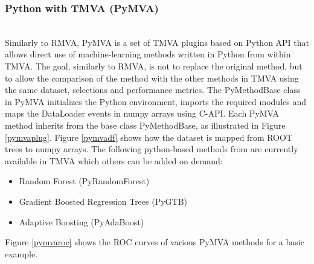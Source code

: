 \documentclass[a4paper]{jpconf}
\begin{document}
\subsubsection{Python with TMVA (PyMVA)} \label{PYMVA}\hspace*{\fill} \\
Similarly to RMVA, PyMVA is a set of TMVA plugins based on Python API that allows direct use of machine-learning methods written in Python from within TMVA. The goal, similarly to RMVA, is not to replace the original method, but to allow the comparison of the method with the other methods in TMVA using the same dataset, selections and performance metrics.\newline
The PyMethodBase class in PyMVA initializes the Python environment, imports the required modules and maps the DataLoader events in numpy arrays using C-API. Each PyMVA method inherits from the base class PyMethodBase, as illustrated in Figure \ref{pymvaplug}. Figure \ref{pymvadf} shows how the dataset is mapped from ROOT trees to numpy arrays. The following python-based methods from \cite{pedregosa2011scikit} are currently available in TMVA which others can be added on demand:
\begin{itemize}
\item Random Forest (PyRandomForest)
\item Gradient Boosted Regression Trees (PyGTB) 
\item Adaptive Boosting (PyAdaBoost) 
\end{itemize}
Figure \ref{pymvaroc} shows the ROC curves of various PyMVA methods for a basic example.
\end{document}
